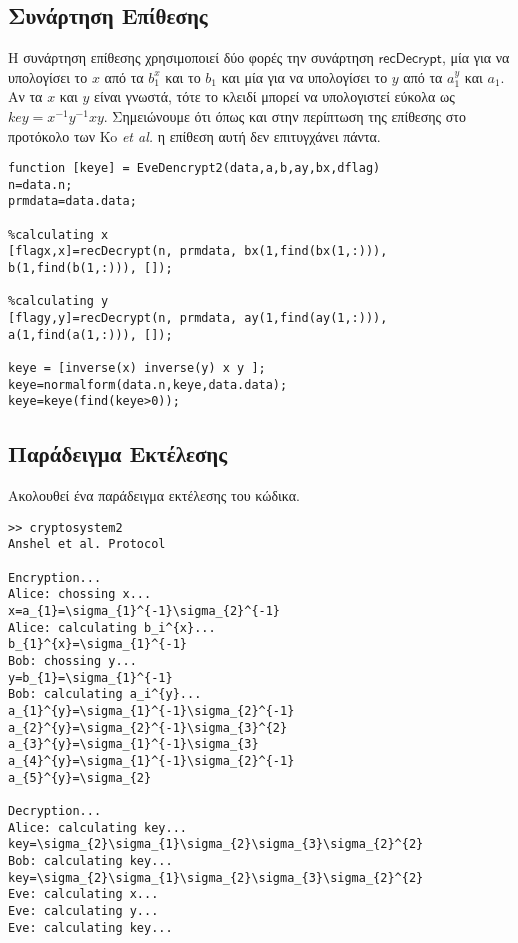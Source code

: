 \documentclass[a4paper,11pt]{article}
\newcommand\ntext[1]{\ensuremath{\mathsf{#1}}}
\begin{document}
\subsection{Συνάρτηση Επίθεσης}

Η συνάρτηση επίθεσης χρησιμοποιεί δύο φορές την συνάρτηση \ntext{recDecrypt}, μία για να υπολογίσει το $ x $ από τα $ b_1^x $ και το $ b_1 $ και μία για να υπολογίσει το $ y $ από τα $ a_1^y $ και $ a_1 $. Αν τα $ x $ και $ y $ είναι γνωστά, τότε το κλειδί μπορεί να υπολογιστεί εύκολα ως $ key=x^{-1}y^{-1}xy $. Σημειώνουμε ότι όπως και στην περίπτωση της επίθεσης στο προτόκολο των Ko \textit{et al.} η επίθεση αυτή δεν επιτυγχάνει πάντα.
\begin{lstlisting}
function [keye] = EveDencrypt2(data,a,b,ay,bx,dflag)
n=data.n;
prmdata=data.data;

%calculating x
[flagx,x]=recDecrypt(n, prmdata, bx(1,find(bx(1,:))), b(1,find(b(1,:))), []);

%calculating y
[flagy,y]=recDecrypt(n, prmdata, ay(1,find(ay(1,:))), a(1,find(a(1,:))), []);

keye = [inverse(x) inverse(y) x y ];
keye=normalform(data.n,keye,data.data);
keye=keye(find(keye>0));
\end{lstlisting}


\subsection{Παράδειγμα Εκτέλεσης}
Ακολουθεί ένα παράδειγμα εκτέλεσης του κώδικα.

\begin{lstlisting}
>> cryptosystem2
Anshel et al. Protocol
 
Encryption...
Alice: chossing x...
x=a_{1}=\sigma_{1}^{-1}\sigma_{2}^{-1}
Alice: calculating b_i^{x}...
b_{1}^{x}=\sigma_{1}^{-1}
Bob: chossing y...
y=b_{1}=\sigma_{1}^{-1}
Bob: calculating a_i^{y}...
a_{1}^{y}=\sigma_{1}^{-1}\sigma_{2}^{-1}
a_{2}^{y}=\sigma_{2}^{-1}\sigma_{3}^{2}
a_{3}^{y}=\sigma_{1}^{-1}\sigma_{3}
a_{4}^{y}=\sigma_{1}^{-1}\sigma_{2}^{-1}
a_{5}^{y}=\sigma_{2}
 
Decryption...
Alice: calculating key...
key=\sigma_{2}\sigma_{1}\sigma_{2}\sigma_{3}\sigma_{2}^{2}
Bob: calculating key...
key=\sigma_{2}\sigma_{1}\sigma_{2}\sigma_{3}\sigma_{2}^{2}
Eve: calculating x...
Eve: calculating y...
Eve: calculating key...
\end{lstlisting}
\end{document}
